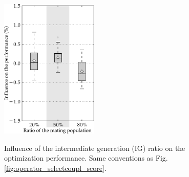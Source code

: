 \documentclass{ametsoc}
\begin{document}
\begin{figure}[t]
	\begin{center}
		\noindent\includegraphics[width=11pc,angle=0]{fig14.pdf}\\
	\end{center}
	\caption{Influence of the intermediate generation (IG) ratio on the optimization performance. Same conventions as Fig. \ref{fig:operator_selectcoupl_score}.}
	\label{fig:option_popratio_score}
\end{figure}
\end{document}
